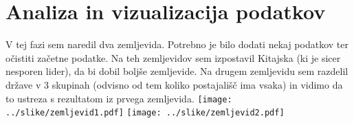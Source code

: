 \documentclass[11pt,a4paper]{article}
\begin{document}



\section{Analiza in vizualizacija podatkov}

V tej fazi sem naredil dva zemljevida. Potrebno je bilo dodati nekaj podatkov ter očistiti začetne podatke. Na teh zemljevidov sem izpostavil Kitajska (ki je sicer nesporen lider), da bi dobil boljše zemljevide. Na drugem zemljevidu sem razdelil države v 3 skupinah (odvisno od tem koliko postajališč ima vsaka) in vidimo da to ustreza s rezultatom iz prvega zemljevida.
\texttt{[image: ../slike/zemljevid1.pdf]}
\texttt{[image: ../slike/zemljevid2.pdf]}


% 
% 
\end{document}
